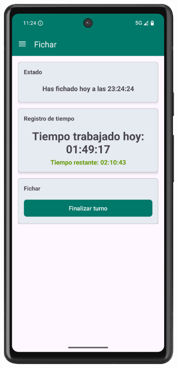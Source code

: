 \begin{figure}[H]
     \centering
     \begin{subfigure}[b]{0.3\textwidth}
         \centering
         \includegraphics[width=\textwidth]{root/fichando.png}

\end{subfigure}
\end{figure}
